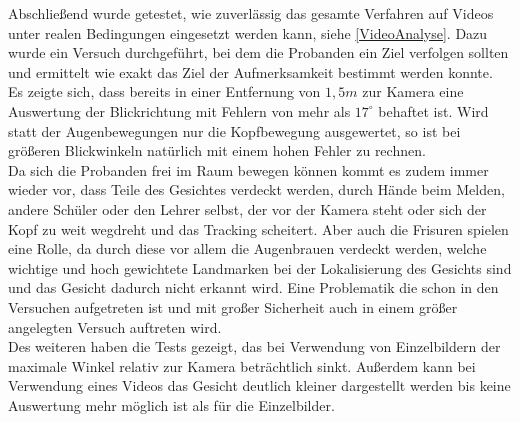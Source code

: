 Abschließend wurde getestet, wie zuverlässig das gesamte Verfahren auf Videos unter realen Bedingungen eingesetzt werden kann, siehe \autoref{VideoAnalyse}. Dazu wurde ein Versuch durchgeführt, bei dem die Probanden ein Ziel verfolgen sollten und ermittelt wie exakt das Ziel der Aufmerksamkeit bestimmt werden konnte. Es zeigte sich, dass bereits in einer Entfernung von $1,5m$ zur Kamera eine Auswertung der Blickrichtung mit Fehlern von mehr als $17^\circ$ behaftet ist. Wird statt der Augenbewegungen nur die Kopfbewegung ausgewertet, so ist bei größeren Blickwinkeln natürlich mit einem hohen Fehler zu rechnen.\\
Da sich die Probanden frei im Raum bewegen können kommt es zudem immer wieder vor, dass Teile des Gesichtes verdeckt werden, durch Hände beim Melden, andere Schüler oder den Lehrer selbst, der vor der Kamera steht oder sich der Kopf zu weit wegdreht und das Tracking scheitert. Aber auch die Frisuren spielen eine Rolle, da durch diese vor allem die Augenbrauen verdeckt werden, welche wichtige und hoch gewichtete Landmarken bei der Lokalisierung des Gesichts sind und das Gesicht dadurch nicht erkannt wird. Eine Problematik die schon in den Versuchen aufgetreten ist und mit großer Sicherheit auch in einem größer angelegten Versuch auftreten wird.\\
Des weiteren haben die Tests gezeigt, das bei Verwendung von Einzelbildern der maximale Winkel relativ zur Kamera beträchtlich sinkt. Außerdem kann bei Verwendung eines Videos das Gesicht deutlich kleiner dargestellt werden bis keine Auswertung mehr möglich ist als für die Einzelbilder.

